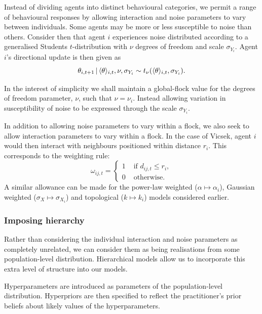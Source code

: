 Instead of dividing agents into distinct behavioural categories, we permit a
range of behavioural responses by allowing interaction and noise parameters to
vary between individuals. Some agents may be more or less susceptible to noise
than others. Consider then that agent $i$ experiences noise distributed
according to a generalised Students $t$-distribution with $\nu$ degrees of
freedom and scale $\sigma_{Y_i}$. Agent $i$'s directional update is then given
as
\begin{equation*}
  \theta_{i,t+1} \,|\, \langle\theta\rangle_{i,t}, \nu, \sigma_{Y_i} \sim
    t_{\nu}(\langle\theta\rangle_{i,t}, \sigma_{Y_i}).
\end{equation*}

In the interest of simplicity we shall maintain a global-flock value for the
degrees of freedom parameter, $\nu$, such that $\nu = \nu_i$. Instead allowing
variation in susceptibility of noise to be expressed through the scale
$\sigma_{Y_i}$.

In addition to allowing noise parameters to vary within a flock, we also seek
to allow interaction parameters to vary within a flock. In the case of Vicsek,
agent $i$ would then interact with neighbours positioned within distance $r_i$.
This corresponds to the weighting rule:
\begin{equation}
    \omega_{ij,t} =
    \begin{cases}
        1 & \text{ if } d_{ij, t} \leq r_i,\\
        0 & \text{ otherwise.}
    \end{cases}
\end{equation}
A similar allowance can be made for the power-law weighted ($\alpha \mapsto
\alpha_i$), Gaussian weighted ($\sigma_X \mapsto \sigma_{X_i}$)
and topological ($k \mapsto k_i$) models considered earlier.


\subsubsection{Imposing hierarchy}
\label{ssec:hier_mod}

Rather than considering the individual interaction and noise parameters as
completely unrelated, we can consider them as being realisations from some
population-level distribution. Hierarchical models allow us to incorporate this
extra level of structure into our models.

Hyperparameters are introduced as parameters of the population-level
distribution. Hyperpriors are then specified to reflect the practitioner's
prior beliefs about likely values of the hyperparameters.

